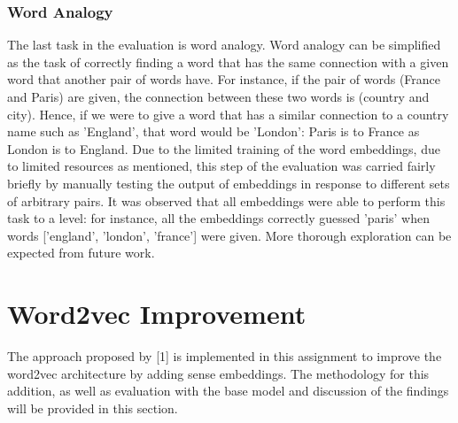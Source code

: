 \documentclass[12pt,a4paper]{article}
\begin{document}
	\subsubsection{Word Analogy}
	The last task in the evaluation is word analogy. Word analogy can be simplified as the task of correctly finding a word that has the same connection with a given word that another pair of words have. For instance, if the pair of words (France and Paris) are given, the connection between these two words is (country and city). Hence, if we were to give a word that has a similar connection to a country name such as 'England', that word would be 'London': Paris is to France as London is to England. Due to the limited training of the word embeddings, due to limited resources as mentioned, this step of the evaluation was carried fairly briefly by manually testing the output of embeddings in response to different sets of arbitrary pairs. It was observed that all embeddings were able to perform this task to a level: for instance, all the embeddings correctly guessed 'paris' when words ['england', 'london', 'france'] were given. More thorough exploration can be expected from future work.
	
	\section{Word2vec Improvement}
	The approach proposed by [1] is implemented in this assignment to improve the word2vec architecture by adding sense embeddings. The methodology for this addition, as well as evaluation with the base model and discussion of the findings will be provided in this section.
\end{document}
